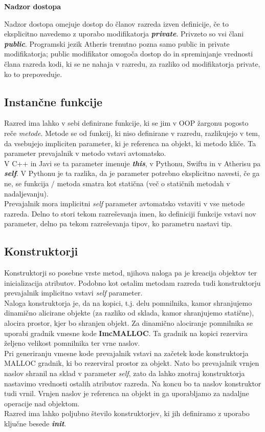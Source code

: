 \documentclass[a4paper, 12p]{book}
\begin{document}
\textbf{Nadzor dostopa}

Nadzor dostopa omejuje dostop do članov razreda izven definicije, če to eksplicitno navedemo z uporabo modifikatorja \textit{\textbf{private}}. Privzeto so vsi člani \textit{\textbf{public}}. Programski jezik Atheris trenutno pozna samo public in private modifikatorja; public modifikator omogoča dostop do in spreminjanje vrednosti člana razreda kodi, ki se ne nahaja v razredu, za razliko od modifikatorja private, ko to prepoveduje. 

\subsection{Instančne funkcije}

Razred ima lahko v sebi definirane funkcije, ki se jim v OOP žargonu pogosto reče \textit{metode}. Metode se od funkcij, ki niso definirane v razredu, razlikujejo v tem, da vsebujejo impliciten parameter, ki je referenca na objekt, ki metodo kliče. Ta parameter prevajalnik v metodo vstavi avtomatsko. \\
\indent V C++ in Javi se ta parameter imenuje \textbf{\textit{this}}, v Pythonu, Swiftu in v Atherisu pa \textbf{\textit{self}}. V Pythonu je ta razlika, da je parameter potrebno eksplicitno navesti, če ga ne, se funkcija / metoda smatra kot statična (več o statičnih metodah v nadaljevanju). \\
\indent Prevajalnik mora implicitni \textit{self} parameter avtomatsko vstaviti v vse metode razreda. Delno to stori tekom razreševanja imen, ko definiciji funkcije vstavi nov parameter, delno pa tekom razreševanja tipov, ko parametru nastavi tip. \\

\subsection{Konstruktorji}

Konstruktorji so posebne vrste metod, njihova naloga pa je kreacija objektov ter inicializacija atributov. Podobno kot ostalim metodam razreda tudi konstruktorju prevajalnik implicitno vstavi \textit{self} parameter. \\
\indent Naloga konstruktorja je, da na kopici, t.j. delu pomnilnika, kamor shranjujemo dinamično alicirane objekte (za razliko od sklada, kamor shranjujemo statične), alocira prostor, kjer bo shranjen objekt. Za dinamično alociranje pomnilnika se uporabi gradnik vmesne kode \textbf{ImcMALLOC}. Ta gradnik na kopici rezervira željeno velikost pomnilnika ter vrne naslov. \\
\indent Pri generiranju vmesne kode prevajalnik vstavi na začetek kode konstruktorja MALLOC gradnik, ki bo rezerviral prostor za objekt. Nato bo prevajalnik vrnjen naslov shranil na sklad v parameter \textit{self}, zato da lahko znotraj konstruktorja nastavimo vrednosti ostalih atributov razreda. Na koncu bo ta naslov konstruktor tudi vrnil. Vrnjen naslov je referenca na objekt in ga uporabljamo za nadaljne operacije nad objektom. \\
\indent Razred ima lahko poljubno število konstruktorjev, ki jih definiramo z uporabo ključne besede \textit{\textbf{init}}. 
\end{document}
